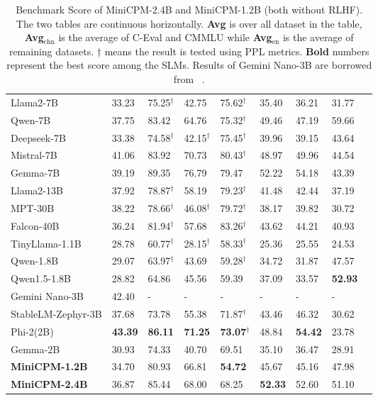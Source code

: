 \begin{table}[!htbp]
{\begin{tabular}{lm{1.2cm}m{1.2cm}m{1.2cm}m{1.7cm}m{1.2cm}m{1.2cm}m{1.2cm}m{1.2cm}}
\midrule
Llama2-7B  & 33.23 & 75.25$^{\dag}$ & 42.75 & 75.62$^{\dag}$ & 35.40 & 36.21 & 31.77 \\
Qwen-7B  & 37.75 & 83.42 & 64.76 & 75.32$^{\dag}$ & 49.46 & 47.19 & 59.66 \\
Deepseek-7B  & 33.38 & 74.58$^{\dag}$ & 42.15$^{\dag}$ & 75.45$^{\dag}$ & 39.96 & 39.15 & 43.64 \\
Mistral-7B & 41.06 & 83.92 & 70.73 & 80.43$^{\dag}$ & 48.97 & 49.96 & 44.54 \\
Gemma-7B  & 39.19 & 89.35 & 76.79 & 79.47 & 52.22 & 54.18 & 43.39 \\
\midrule
Llama2-13B & 37.92 & 78.87$^{\dag}$ & 58.19 & 79.23$^{\dag}$ & 41.48 & 42.44 & 37.19 \\
MPT-30B  & 38.22 & 78.66$^{\dag}$ & 46.08$^{\dag}$ & 79.72$^{\dag}$ & 38.17 & 39.82 & 30.72 \\
Falcon-40B & 36.24 & 81.94$^{\dag}$ & 57.68 & 83.26$^{\dag}$ & 43.62 & 44.21 & 40.93 \\
\midrule
TinyLlama-1.1B  & 28.78 & 60.77$^{\dag}$ & 28.15$^{\dag}$ & 58.33$^{\dag}$ & 25.36 & 25.55 & 24.53 \\
Qwen-1.8B  & 29.07 & 63.97$^{\dag}$ & 43.69 & 59.28$^{\dag}$ & 34.72 & 31.87 & 47.57 \\
Qwen1.5-1.8B  & 28.82 & 64.86 & 45.56 & 59.39 & 37.09 & 33.57 & \textbf{52.93} \\
Gemini Nano-3B & 42.40 & - & - & - & - & - & - \\
StableLM-Zephyr-3B  & 37.68 & 73.78 & 55.38 & 71.87$^{\dag}$ & 43.46 & 46.32 & 30.62 \\
Phi-2(2B)  & \textbf{43.39} & \textbf{86.11} & \textbf{71.25} & \textbf{73.07$^{\dag}$} & 48.84 & \textbf{54.42} & 23.78 \\
Gemma-2B  & 30.93 & 74.33 & 40.70 & 69.51 & 35.10 & 36.47 & 28.91\\
\midrule
\textbf{MiniCPM-1.2B}  & 34.70 & 80.93 & 66.81 &  \textbf{54.72} &  45.67 & 45.16 & 47.98 \\
\textbf{MiniCPM-2.4B}  & 36.87 & 85.44 & 68.00 & 68.25 & \textbf{52.33} & 52.60 & 51.10 \\
\bottomrule
\end{tabular}
}
\caption{Benchmark Score of MiniCPM-2.4B and MiniCPM-1.2B (both without RLHF). The two tables are continuous horizontally. \textbf{Avg} is over all dataset in the table, \textbf{Avg$_{\text{chn}}$} is the average of C-Eval and CMMLU while \textbf{Avg$_{\text{en}}$} is the average of remaining datasets. $\dag$ means the result is tested using PPL metrics. \textbf{Bold} numbers represent the best score among the SLMs. Results of Gemini Nano-3B are borrowed from ~\cite{team2023gemini}.}
\label{tab:benchmark_without_rlhf}
\end{table}
\vspace{-5mm}
